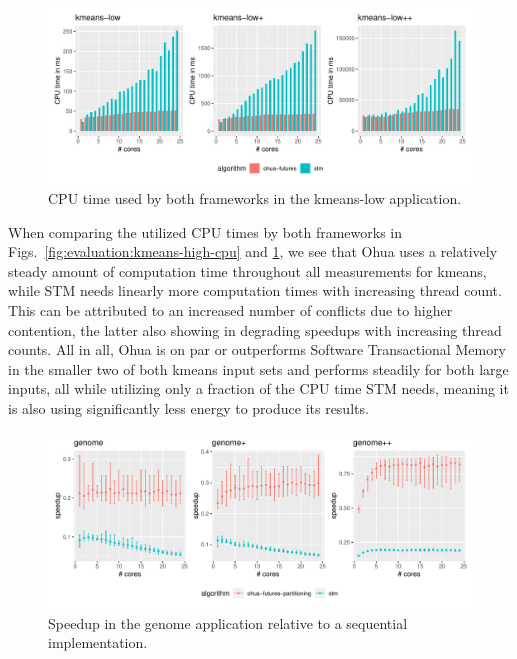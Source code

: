 \begin{figure}
    \centering
    \includegraphics[width=\textwidth,keepaspectratio]{gfx/results/cpu_kmeans-low_comb}
    \caption{CPU time used by both frameworks in the kmeans-low application.}%
    \label{fig:evaluation:kmeans-low-cpu}
\end{figure}

When comparing the utilized CPU times by both frameworks in Figs.~\ref{fig:evaluation:kmeans-high-cpu} and \ref{fig:evaluation:kmeans-low-cpu}, we see that Ohua uses a relatively steady amount of computation time throughout all measurements for kmeans, while STM needs linearly more computation times with increasing thread count.
This can be attributed to an increased number of conflicts due to higher contention, the latter also showing in degrading speedups with increasing thread counts.
All in all, Ohua is on par or outperforms Software Transactional Memory in the smaller two of both kmeans input sets and performs steadily for both large inputs, all while utilizing only a fraction of the CPU time STM needs, meaning it is also using significantly less energy to produce its results.

\begin{figure}
    \centering
    \includegraphics[width=\textwidth,keepaspectratio]{gfx/results/genome_comb}
    \caption{Speedup in the genome application relative to a sequential implementation.}%
    \label{fig:evaluation:genome}
\end{figure}

